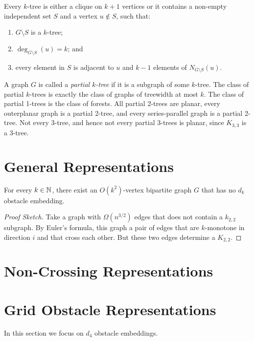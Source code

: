 \documentclass{patmorin}
\begin{document}
\begin{lem}
   Every $k$-tree is either a clique on $k+1$ vertices or it contains a non-empty independent set $S$ and a vertex $u\not\in S$, such that:
\begin{enumerate}
   \item $G\setminus S$ is a $k$-tree;
   \item $\deg_{G\setminus S}(u)=k$; and 
   \item every element in $S$ is adjacent to $u$ and $k-1$ elements of
   $N_{G\setminus S}(u)$.
\end{enumerate}
\end{lem}

A graph $G$ is called a \emph{partial $k$-tree} if it is a subgraph of
some $k$-tree.  The class of partial $k$-trees is exactly the class of
graphs of treewidth at most $k$.  The class of partial 1-trees is the
class of forests.  All partial 2-trees are planar, every outerplanar graph
is a partial 2-tree, and every series-parallel graph is a partial 2-tree.
Not every 3-tree, and hence not every partial 3-trees is planar, since
$K_{3,3}$ is a 3-tree.

\section{General Representations}

\begin{thm}
  For every $k\in \mathbb{N}$, there exist an $O(k^2)$-vertex bipartite graph $G$ that
  has no $d_k$ obstacle embedding.
\end{thm}

\begin{proof}[Proof Sketch]
   Take a graph with $\Omega(n^{3/2})$ edges that does not contain a
   $k_{2,2}$ subgraph. By Euler's formula, this graph a pair of edges
   that are $k$-monotone in direction $i$ and that cross each other. But
   these two edges determine a $K_{2,2}$.
\end{proof}

\section{Non-Crossing Representations}

\section{Grid Obstacle Representations}

In this section we focus on $d_4$ obstacle embeddings.
\end{document}
